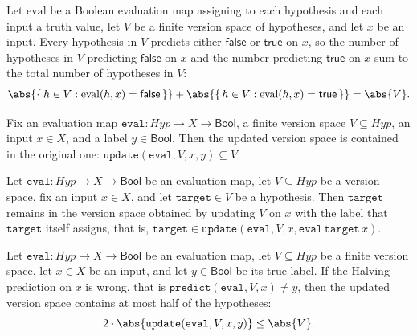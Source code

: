 \begin{lemma}
\label{Halving.voteFor_false_add_true}
\leanok
{}
Let $\mathrm{eval}$ be a Boolean evaluation map assigning to each hypothesis and each
input a truth value, let $V$ be a finite version space of hypotheses, and let $x$ be an
input. Every hypothesis in $V$ predicts either $\mathsf{false}$ or $\mathsf{true}$ on
$x$, so the number of hypotheses in $V$ predicting $\mathsf{false}$ on $x$ and the
number predicting $\mathsf{true}$ on $x$ sum to the total number of hypotheses in $V$:
\[
  \abs{\{\,h \in V : \mathrm{eval}(h, x) = \mathsf{false}\,\}} +
  \abs{\{\,h \in V : \mathrm{eval}(h, x) = \mathsf{true}\,\}} = \abs{V}.
\]
\end{lemma}

\begin{lemma}
\label{Halving.update_subset}
\leanok
{}
Fix an evaluation map $\mathtt{eval} : \mathit{Hyp} \to X \to \mathsf{Bool}$, a finite
version space $V \subseteq \mathit{Hyp}$, an input $x \in X$, and a label $y \in
\mathsf{Bool}$. Then the updated version space is contained in the original one:
$\mathtt{update}(\mathtt{eval}, V, x, y) \subseteq V$.
\end{lemma}

\begin{lemma}
\label{Halving.target_mem_update}
\leanok
{}
Let $\mathtt{eval} : \mathit{Hyp} \to X \to \mathsf{Bool}$ be an evaluation map, let $V
\subseteq \mathit{Hyp}$ be a version space, fix an input $x \in X$, and let
$\mathtt{target} \in V$ be a hypothesis. Then $\mathtt{target}$ remains in the version
space obtained by updating $V$ on $x$ with the label that $\mathtt{target}$ itself
assigns, that is, $\mathtt{target} \in \mathtt{update}(\mathtt{eval}, V, x,
\mathtt{eval}\,\mathtt{target}\,x)$.
\end{lemma}

\begin{lemma}
\label{Halving.mistake_halves}
\leanok
{}
Let $\mathtt{eval} : \mathit{Hyp} \to X \to \mathsf{Bool}$ be an evaluation map, let $V
\subseteq \mathit{Hyp}$ be a finite version space, let $x \in X$ be an input, and let $y
\in \mathsf{Bool}$ be its true label. If the Halving prediction on $x$ is wrong, that is
$\mathtt{predict}(\mathtt{eval}, V, x) \ne y$, then the updated version space contains
at most half of the hypotheses:
\[
  2 \cdot \abs{\mathtt{update}(\mathtt{eval}, V, x, y)} \le \abs{V}.
\]
\end{lemma}

